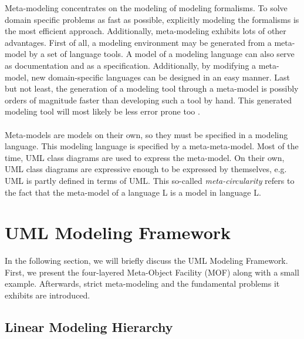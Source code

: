Meta-modeling concentrates on the modeling of modeling formalisms. To solve domain specific problems as fast as possible, explicitly modeling the formalisms is the most efficient approach. Additionally, meta-modeling exhibits lots of other advantages. First of all, a modeling environment may be generated from a meta-model by a set of language tools. A model of a modeling language can also serve as documentation and as a specification. Additionally, by modifying a meta-model, new domain-specific languages can be designed in an easy manner. Last but not least, the generation of a modeling tool through a meta-model is possibly orders of magnitude faster than developing such a tool by hand. This generated modeling tool will most likely be less error prone too \cite{CAMPaM}.
\\ \\
Meta-models are models on their own, so they must be specified in a modeling language. This modeling language is specified by a meta-meta-model. Most of the time, UML class diagrams are used to express the meta-model. On their own, UML class diagrams are expressive enough to be expressed by themselves, e.g. UML is partly defined in terms of UML. This so-called \textit{meta-circularity} refers to the fact that the meta-model of a language L is a model in language L.

\section{UML Modeling Framework}

In the following section, we will briefly discuss the UML Modeling Framework. First, we present the four-layered Meta-Object Facility (MOF) along with a small example. Afterwards, strict meta-modeling and the fundamental problems it exhibits are introduced.

\subsection{Linear Modeling Hierarchy}

